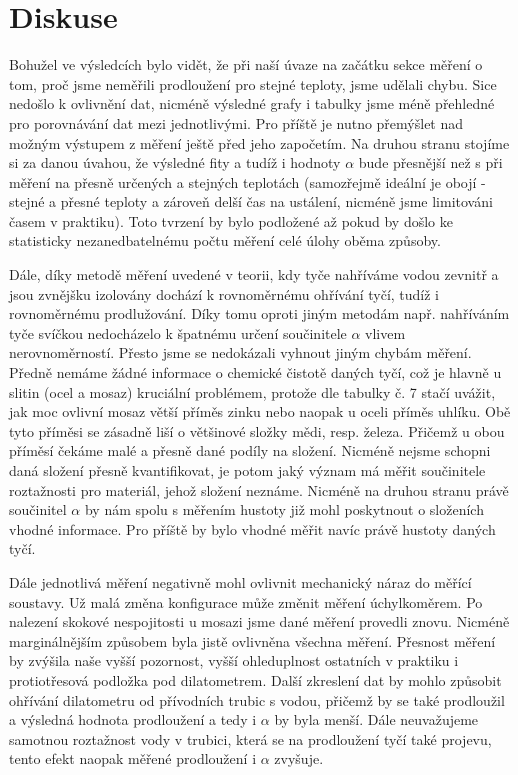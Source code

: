 \documentclass{article}
\begin{document}
\section*{Diskuse}
\par Bohužel ve výsledcích bylo vidět, že při naší úvaze na začátku sekce měření o tom, proč jsme neměřili prodloužení pro stejné teploty, jsme udělali chybu. Sice nedošlo k ovlivnění dat, nicméně výsledné grafy i tabulky jsme méně přehledné pro porovnávání dat mezi jednotlivými. Pro příště je nutno přemýšlet nad možným výstupem z měření ještě před jeho započetím. Na druhou stranu stojíme si za danou úvahou, že výsledné fity a tudíž i hodnoty $\alpha$ bude přesnější než s při měření na přesně určených a stejných teplotách (samozřejmě ideální je obojí - stejné a přesné teploty a zároveň delší čas na ustálení, nicméně jsme limitováni časem v praktiku). Toto tvrzení by bylo podložené až pokud by došlo ke statisticky nezanedbatelnému počtu měření celé úlohy oběma způsoby. 
\par Dále, díky metodě měření uvedené v teorii, kdy tyče nahříváme vodou zevnitř a jsou zvnějšku izolovány dochází k rovnoměrnému ohřívání tyčí, tudíž i rovnoměrnému prodlužování. Díky tomu oproti jiným metodám např. nahříváním tyče svíčkou nedocházelo k špatnému určení součinitele $\alpha$ vlivem nerovnoměrností. Přesto jsme se nedokázali vyhnout jiným chybám měření. Předně nemáme žádné informace o chemické čistotě daných tyčí, což je hlavně u slitin (ocel a mosaz) kruciální problémem, protože dle tabulky č. 7 stačí uvážit, jak moc ovlivní mosaz větší příměs zinku nebo naopak u oceli příměs uhlíku. Obě tyto příměsi se zásadně liší o většinové složky mědi, resp. železa. Přičemž u obou příměsí čekáme malé a přesně dané podíly na složení. Nicméně nejsme schopni daná složení přesně kvantifikovat, je potom jaký význam má měřit součinitele roztažnosti pro materiál, jehož složení neznáme. Nicméně na druhou stranu právě součinitel $\alpha$ by nám spolu s měřením hustoty již mohl poskytnout o složeních vhodné informace. Pro příště by bylo vhodné měřit navíc právě hustoty daných tyčí.
\par Dále jednotlivá měření negativně mohl ovlivnit mechanický náraz do měřící soustavy. Už malá změna konfigurace může změnit měření úchylkoměrem. Po nalezení skokové nespojitosti u mosazi jsme dané měření provedli znovu. Nicméně marginálnějším způsobem byla jistě ovlivněna všechna měření. Přesnost měření by zvýšila naše vyšší pozornost, vyšší ohleduplnost ostatních v praktiku i protiotřesová podložka pod dilatometrem. Další zkreslení dat by mohlo způsobit ohřívání dilatometru od přívodních trubic s vodou, přičemž by se také prodloužil a výsledná hodnota prodloužení a tedy i $\alpha$ by byla menší. Dále neuvažujeme samotnou roztažnost vody v trubici, která se na prodloužení tyčí také projevu, tento efekt naopak měřené prodloužení i $\alpha$ zvyšuje.
\end{document}
